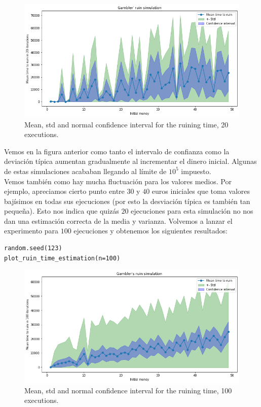 \documentclass[a4paper]{article}
\begin{document}
\begin{figure}[H]
	\includegraphics[scale=.6]{figures/gambler2}
	\centering
	\caption{Mean, std and normal confidence interval for the ruining time, 20 executions.}
\end{figure}

Vemos en la figura anterior como tanto el intervalo de confianza como la deviación típica aumentan gradualmente al incrementar el dinero inicial. Algunas de estas simulaciones acababan llegando al límite de $10^5$ impuesto. \\

Vemos también como hay mucha fluctuación para los valores medios. Por ejemplo, apreciamos cierto punto entre $30$ y $40$ euros iniciales que toma valores bajísimos en todas sus ejecuciones (por esto la desviación típica es también tan pequeña). Esto nos indica que quizás $20$ ejecuciones para esta simulación no nos dan una estimación correcta de la media y varianza. Volvemos a lanzar el experimento para $100$ ejecuciones y obtenemos los siguientes resultados:

\begin{verbatim}
random.seed(123)
plot_ruin_time_estimation(n=100)
\end{verbatim}

\begin{figure}[H]
	\includegraphics[scale=.6]{figures/gambler2_1}
	\centering
	\caption{Mean, std and normal confidence interval for the ruining time, 100 executions.}
\end{figure}
\end{document}
